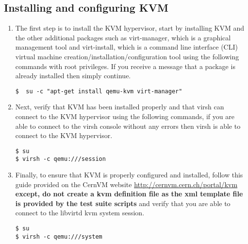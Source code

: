 \subsection{Installing and configuring KVM}
\label{sec:debiankvm}
\begin{enumerate}
\item	The first step is to install the KVM hypervisor, start by installing KVM and the other additional packages such
		as virt-manager, which is a graphical management tool and virt-install, which is a command line interface (CLI)
		virtual machine creation/installation/configuration tool using the following commands with root privileges. If
		you receive a message that a package is already installed then simply continue.

\lstset{language=bash,caption=Installing KVM and Other Related Programs}
\begin{lstlisting}
$  su -c "apt-get install qemu-kvm virt-manager"
\end{lstlisting}

\item	Next, verify that KVM has been installed properly and that virsh can connect to the KVM hypervisor using the
		following commands, if you are able to connect to the virsh console without any errors then virsh is able
		to connect to the KVM hypervisor.

\lstset{language=bash,caption=Verify that virsh can Access KVM}
\begin{lstlisting}
$ su
$ virsh -c qemu:///session
\end{lstlisting}

\item 	Finally, to ensure that KVM is properly configured and installed, follow this guide provided on the CernVM website
		\url{http://cernvm.cern.ch/portal/kvm} {\bf except, do not create a kvm definition file as the xml template file
		is provided by the test suite scripts} and verify that you are able to connect to the libvirtd kvm system session.
		
\lstset{language=bash,caption=Verify that KVM is Properly Configured}
\begin{lstlisting}
$ su
$ virsh -c qemu:///system 
\end{lstlisting}
\end{enumerate}



